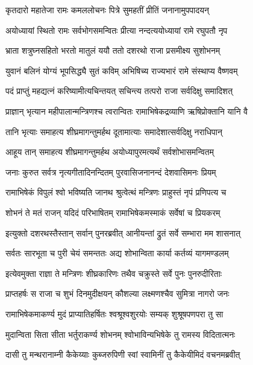 
\twolineshloka
{कृतदारो महातेजा रामः कमललोचनः}
{पित्रे सुमहतीं प्रीतिं जनानामुपपादयन्} %

\twolineshloka
{अयोध्यायां स्थितो रामः सर्वभोगसमन्वितः}
{प्रीत्या नन्दत्ययोध्यायां रामे रघुपतौ नृप} %

\twolineshloka
{भ्राता शत्रुघ्नसहितो भरतो मातुलं ययौ}
{ततो दशरथो राजा प्रसमीक्ष्य सुशोभनम्} %

\twolineshloka
{युवानं बलिनं योग्यं भूपसिद्ध्यै सुतं कविम्}
{अभिषिच्य राज्यभारं रामे संस्थाप्य वैष्णवम्} %

\twolineshloka
{पदं प्राप्तुं महद्यत्नं करिष्यामीत्यचिन्तयत्}
{सचिन्त्य तत्परो राजा सर्वदिक्षु समादिशत्} %

\twolineshloka
{प्राज्ञान् भृत्यान महीपालान्मन्त्रिणश्च त्वरान्वितः}
{रामाभिषेकद्रव्याणि ऋषिप्रोक्तानि यानि वै} %

\twolineshloka
{तानि भृत्याः समाहत्य शीघ्रमागन्तुमर्हथ}
{दूतामात्याः समादेशात्सर्वदिक्षु नराधिपान्} %

\twolineshloka
{आहूय तान् समाहत्य शीघ्रमागन्तुमर्हथ}
{अयोध्यापुरमत्यर्थं सर्वशोभासमन्वितम्} %

\twolineshloka
{जनाः कुरुत सर्वत्र नृत्यगीतादिनन्दितम्}
{पुरवासिजनानन्दं देशवासिमनः प्रियम्} %

\twolineshloka
{रामाभिषेकं विपुलं श्वो भविष्यति जानथ}
{श्रुत्वेत्थं मन्त्रिणः प्राहुस्तं नृपं प्रणिपत्य च} %

\twolineshloka
{शोभनं ते मतं राजन् यदिदं परिभाषितम्}
{रामाभिषेकमस्माकं सर्वेषां च प्रियकरम्} %

\twolineshloka
{इत्युक्तो दशरथस्तैस्तान् सर्वान् पुनरब्रवीत्}
{आनीयन्तां द्रुतं सर्वे सम्भारा मम शासनात्} %

\twolineshloka
{सर्वतः सारभूता च पुरी चेयं समन्ततः}
{अद्य शोभान्विता कार्या कर्तव्यं यागमण्डलम्} %

\twolineshloka
{इत्येवमुक्ता राज्ञा ते मन्त्रिणः शीघ्रकारिणः}
{तथैव चक्रुस्ते सर्वे पुनः पुनरुदीरिताः} %

\twolineshloka
{प्राप्तहर्षः स राजा च शुभं दिनमुदीक्षयन्}
{कौशल्या लक्ष्मणश्चैव सुमित्रा नागरो जनः} %

\twolineshloka
{रामाभिषेकमाकर्ण्य मुदं प्राप्यातिहर्षितः}
{श्वश्रूश्वशुरयोः सम्यक् शुश्रूषपणपरा तु सा} %

\twolineshloka
{मुदान्विता सिता सीता भर्तुराकर्ण्य शोभनम्}
{श्वोभाविन्यभिषेके तु रामस्य विदितात्मनः} %

\twolineshloka
{दासी तु मन्थरानाम्नी कैकेय्याः कुब्जरुपिणी}
{स्वां स्वामिनीं तु कैकेयीमिदं वचनमब्रवीत्} %

